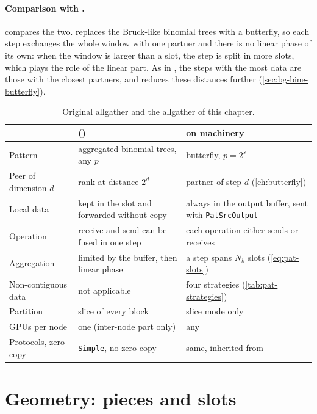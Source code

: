 \paragraph{Comparison with \pat{}.}
 compares the two.
\bine{} replaces the Bruck-like binomial trees with a butterfly, so each step exchanges the whole window with one partner and there is no linear phase of its own: when the window is larger than a slot, the step is split in more slots, which plays the role of the linear part.
As in \pat{}, the steps with the most data are those with the closest partners, and \bine{} reduces these distances further (\cref{sec:bg-bine-butterfly}).

\begin{table}[t]
\centering
\footnotesize
\setlength{\tabcolsep}{4pt}
\caption{Original \pat{} allgather and the \bine{} allgather of this chapter.}
\label{tab:pat-vs-bine}
\begin{tabularx}{\linewidth}{@{}l X X@{}}
\toprule
 & \pat{} (\nccl{}) & \bine{} on \pat{} machinery \\
\midrule
Pattern & aggregated binomial trees, any $p$ & \bine{} butterfly, $p=2^s$ \\
Peer of dimension $d$ & rank at distance $2^d$ & partner of step $d$ (\cref{ch:butterfly}) \\
Local data & kept in the slot and forwarded without copy & always in the output buffer, sent with \texttt{PatSrcOutput} \\
Operation & receive and send can be fused in one step & each operation either sends or receives \\
Aggregation & limited by the buffer, then linear phase & a step spans $N_k$ slots (\cref{eq:pat-slots}) \\
Non-contiguous data & not applicable & four strategies (\cref{tab:pat-strategies}) \\
Partition & slice of every block & slice mode only \\
GPUs per node & one (inter-node part only) & any \\
Protocols, zero-copy & \texttt{Simple}, no zero-copy & same, inherited from \pat{} \\
\bottomrule
\end{tabularx}
\end{table}

\section{Geometry: pieces and slots}\label{sec:pat-geom}

